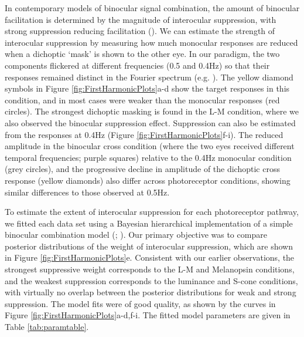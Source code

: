 \documentclass[
]{article}
\begin{document}
In contemporary models of binocular signal combination, the amount of binocular facilitation is determined by the magnitude of interocular suppression, with strong suppression reducing facilitation (). We can estimate the strength of interocular suppression by measuring how much monocular responses are reduced when a dichoptic `mask' is shown to the other eye. In our paradigm, the two components flickered at different frequencies (0.5 and 0.4Hz) so that their responses remained distinct in the Fourier spectrum (e.g. ). The yellow diamond symbols in Figure \ref{fig:FirstHarmonicPlots}a-d show the target responses in this condition, and in most cases were weaker than the monocular responses (red circles). The strongest dichoptic masking is found in the L-M condition, where we also observed the binocular suppression effect. Suppression can also be estimated from the responses at 0.4Hz (Figure \ref{fig:FirstHarmonicPlots}f-i). The reduced amplitude in the binocular cross condition (where the two eyes received different temporal frequencies; purple squares) relative to the 0.4Hz monocular condition (grey circles), and the progressive decline in amplitude of the dichoptic cross response (yellow diamonds) also differ across photoreceptor conditions, showing similar differences to those observed at 0.5Hz.

To estimate the extent of interocular suppression for each photoreceptor pathway, we fitted each data set using a Bayesian hierarchical implementation of a simple binocular combination model (; ). Our primary objective was to compare posterior distributions of the weight of interocular suppression, which are shown in Figure \ref{fig:FirstHarmonicPlots}e. Consistent with our earlier observations, the strongest suppressive weight corresponds to the L-M and Melanopsin conditions, and the weakest suppression corresponds to the luminance and S-cone conditions, with virtually no overlap between the posterior distributions for weak and strong suppression. The model fits were of good quality, as shown by the curves in Figure \ref{fig:FirstHarmonicPlots}a-d,f-i. The fitted model parameters are given in Table \ref{tab:paramtable}.
\end{document}
